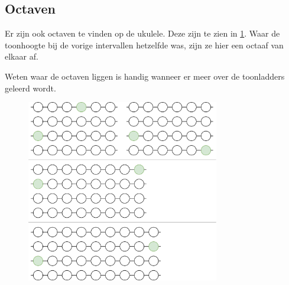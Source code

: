 \newpage

\subsection{Octaven}

Er zijn ook octaven te vinden op de ukulele. Deze zijn te zien in \ref{fig:ukulele_octave_intervals}. Waar de toonhoogte bij de vorige intervallen hetzelfde was, zijn ze hier een octaaf van elkaar af.

Weten waar de octaven liggen is handig wanneer er meer over de toonladders geleerd wordt.

\begin{figure}[h]
    \centering
    \includegraphics[width=0.75\textwidth]{image/ukulele-fretboard-octaves.png}
    \label{fig:ukulele_octave_intervals}
\end{figure}

